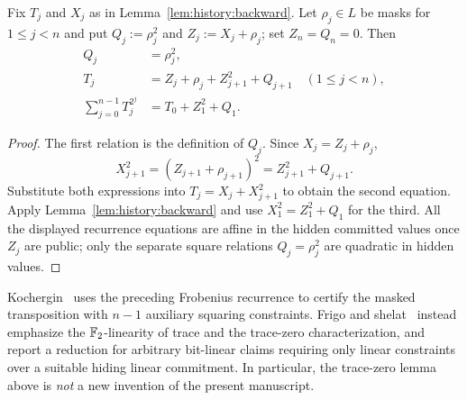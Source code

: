 \begin{lemma}\label{lem:history:affine}
Fix $T_j$ and $X_j$ as in Lemma~\ref{lem:history:backward}. Let $\rho_j\in L$ be masks for $1\leq j<n$ and put $Q_j:=\rho_j^2$ and $Z_j:=X_j+\rho_j$; set $Z_n=Q_n=0$. Then
\begin{align*}
 Q_j&=\rho_j^2,\\
 T_j&=Z_j+\rho_j+Z_{j+1}^2+Q_{j+1}\quad(1\leq j<n),\\
 \sum_{j=0}^{n-1}T_j^{2^j}&=T_0+Z_1^2+Q_1.
\end{align*}
\end{lemma}
\begin{proof}
The first relation is the definition of $Q_j$. Since $X_j=Z_j+\rho_j$,
\[
 X_{j+1}^2=(Z_{j+1}+\rho_{j+1})^2
  =Z_{j+1}^2+Q_{j+1}.
\]
Substitute both expressions into $T_j=X_j+X_{j+1}^2$ to obtain the second equation. Apply Lemma~\ref{lem:history:backward} and use $X_1^2=Z_1^2+Q_1$ for the third. All the displayed recurrence equations are affine in the hidden committed values once $Z_j$ are public; only the separate square relations $Q_j=\rho_j^2$ are quadratic in hidden values.
\end{proof}

\begin{remark}
Kochergin~\cite{Kochergin2026} uses the preceding Frobenius recurrence to certify the masked transposition with $n-1$ auxiliary squaring constraints. Frigo and shelat~\cite{FrigoShelat2026} instead emphasize the $\mathbb{F}_2$-linearity of trace and the trace-zero characterization, and report a reduction for arbitrary bit-linear claims requiring only linear constraints over a suitable hiding linear commitment. In particular, the trace-zero lemma above is \emph{not} a new invention of the present manuscript.
\end{remark}
